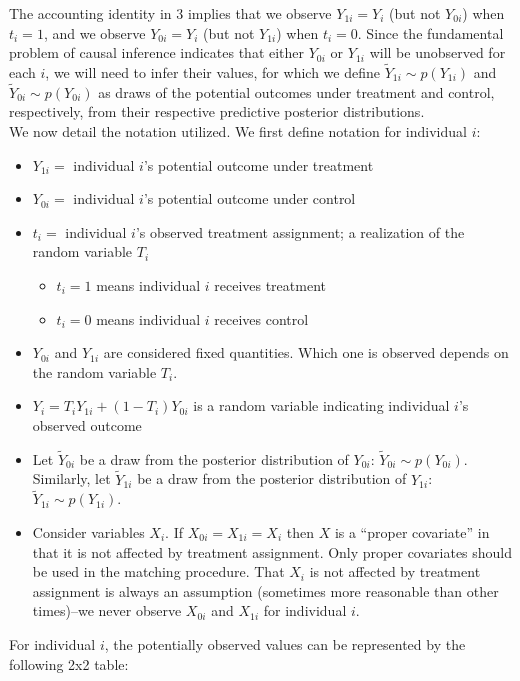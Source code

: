 \documentclass[oneside,letterpaper,titlepage,12pt]{article}
\begin{document}
The accounting identity in 3 implies that we observe $Y_{1i}=Y_i$ (but
not $Y_{0i}$) when $t_i=1$, and we observe $Y_{0i}=Y_i$ (but not
$Y_{1i}$) when $t_i=0$.  Since the fundamental problem of causal
inference indicates that either $Y_{0i}$ or $Y_{1i}$ will be
unobserved for each $i$, we will need to infer their values, for which we
define $\tilde Y_{1i} \sim p(Y_{1i})$  and $\tilde Y_{0i} \sim
p(Y_{0i})$ as draws of the potential outcomes under treatment and
control, respectively, from their respective predictive posterior
distributions.\\

We now detail the notation utilized.  
We first define notation for individual $i$:
\begin{itemize}
\item $Y_{1i}=$ individual $i$'s potential outcome under treatment 
\item $Y_{0i}=$ individual $i$'s potential outcome under control
\item $t_i=$ individual $i$'s observed treatment assignment; a realization of the random variable $T_i$ 
\begin{itemize} \item $t_i=1$ means individual $i$ receives treatment
		\item $t_i=0$ means individual $i$ receives control
\end{itemize}
\item $Y_{0i}$ and $Y_{1i}$ are considered fixed quantities.  Which one is observed depends on the random variable $T_i$.
\item $Y_i=T_i Y_{1i} + (1-T_i) Y_{0i}$ is a random variable indicating individual $i$'s observed outcome
\item Let $\tilde{Y}_{0i}$ be a draw from the posterior distribution of $Y_{0i}$: $\tilde{Y}_{0i} \sim p(Y_{0i})$. 
Similarly, let  $\tilde{Y}_{1i}$ be a draw from the posterior distribution of $Y_{1i}$: $\tilde{Y}_{1i} \sim p(Y_{1i})$.
\item Consider variables $X_i$.  If $X_{0i}=X_{1i}=X_i$ then $X$ is a ``proper covariate'' in that it is not affected by treatment assignment.  Only proper
covariates should be used in the matching procedure.  That $X_i$ is not affected by treatment assignment 
is always an assumption (sometimes more reasonable than other times)--we never observe $X_{0i}$ and $X_{1i}$ for individual $i$.
\end{itemize}

For individual $i$, the potentially observed values can be represented by the following 2x2 table:
\end{document}
